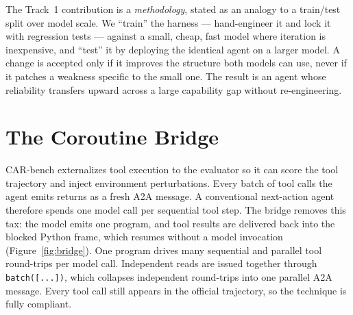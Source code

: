 \documentclass{article}
\begin{document}
The Track~1 contribution is a \emph{methodology}, stated as an analogy to a
train/test split over model scale. We ``train'' the harness --- hand-engineer it
and lock it with regression tests --- against a small, cheap, fast model where
iteration is inexpensive, and ``test'' it by deploying the identical agent on a
larger model. A change is accepted only if it improves the structure both models
can use, never if it patches a weakness specific to the small one. The result is
an agent whose reliability transfers upward across a large capability gap without
re-engineering.

\section{The Coroutine Bridge}

CAR-bench externalizes tool execution to the evaluator so it can score the tool
trajectory and inject environment perturbations. Every batch of tool calls the
agent emits returns as a fresh A2A message. A conventional next-action agent
therefore spends one model call per sequential tool step. The bridge removes this
tax: the model emits one program, and tool results are delivered back into the
blocked Python frame, which resumes without a model invocation
(Figure~\ref{fig:bridge}). One program drives many sequential and parallel tool
round-trips per model call. Independent reads are issued together through
\texttt{batch([...])}, which collapses independent round-trips into one parallel
A2A message. Every tool call still appears in the official trajectory, so the
technique is fully compliant.
\end{document}
